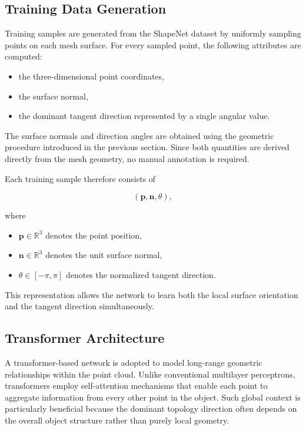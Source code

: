 \documentclass[../main.tex]{subfiles}
\begin{document}
\subsection{Training Data Generation}

Training samples are generated from the ShapeNet dataset by uniformly sampling points on each mesh surface. For every sampled point, the following attributes are computed:

\begin{itemize}
	\item the three-dimensional point coordinates,
	\item the surface normal,
	\item the dominant tangent direction represented by a single angular value.
\end{itemize}

The surface normals and direction angles are obtained using the geometric procedure introduced in the previous section. Since both quantities are derived directly from the mesh geometry, no manual annotation is required.

Each training sample therefore consists of

\[
(\mathbf{p},\mathbf{n},\theta),
\]

where

\begin{itemize}
	\item $\mathbf{p}\in\mathbb{R}^3$ denotes the point position,
	\item $\mathbf{n}\in\mathbb{R}^3$ denotes the unit surface normal,
	\item $\theta\in[-\pi,\pi]$ denotes the normalized tangent direction.
\end{itemize}

This representation allows the network to learn both the local surface orientation and the tangent direction simultaneously.

\subsection{Transformer Architecture}

A transformer-based network is adopted to model long-range geometric relationships within the point cloud. Unlike conventional multilayer perceptrons, transformers employ self-attention mechanisms that enable each point to aggregate information from every other point in the object. Such global context is particularly beneficial because the dominant topology direction often depends on the overall object structure rather than purely local geometry.
\end{document}
